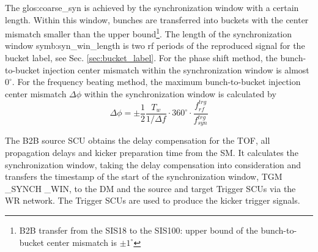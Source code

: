 The \gls{glos:coarse_syn} is achieved by the synchronization window with a certain length. Within this window, bunches are transferred into buckets with the center mismatch smaller than the upper bound\footnote{B2B transfer from the SIS18 to the SIS100: upper bound of the bunch-to-bucket center mismatch is $\pm1^\circ$}. The length of the synchronization window \gls{symb:syn_win_length} is two rf periods of the reproduced signal for the bucket label, see Sec. \ref{sec:bucket_label}. For the phase shift method, the bunch-to-bucket injection center mismatch within the synchronization window is almost $0^\circ$. For the frequency beating method, the maximum bunch-to-bucket injection center mismatch $\Delta \phi$ within the synchronization window is calculated by 
\begin{equation}
\Delta \phi=\pm\frac{1}{2}\frac{T_{w}}{1/\Delta f}\cdot360^\circ\cdot\frac{f_{\mathit{rf}}^{trg}}{f_{\mathit{syn}}^{trg}}
\end{equation}

The B2B source SCU obtains the delay compensation for the TOF, all propagation delays and kicker preparation time from the SM. It calculates the synchronization window, taking the delay compensation into consideration and transfers the timestamp of the start of the synchronization window, TGM \_SYNCH \_WIN, to the DM and the source and target Trigger SCUs via the WR network. The Trigger SCUs are used to produce the kicker trigger signals. 

